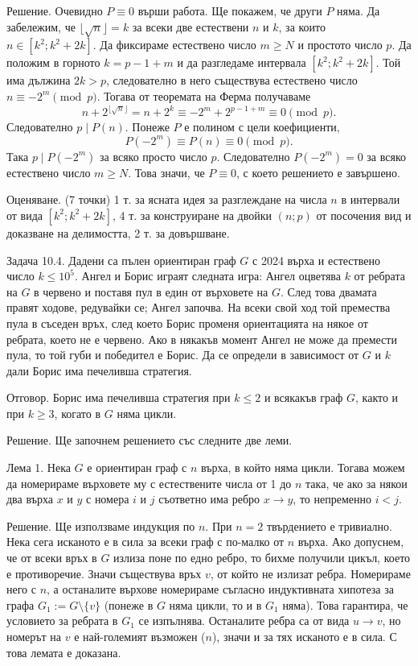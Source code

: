 Решение. Очевидно $P\equiv0$ върши работа. Ще покажем, че други $P$ няма. Да забележим, че $\lfloor\sqrt n\rfloor=k$ за всеки две естествени $n$ и $k$, за които $n\in[k^2;k^2+2k]$. Да фиксираме естествено число $m\geq N$ и простото число $p$. Да положим в горното $k=p-1+m$ и да разгледаме интервала $[k^2;k^2+2k]$. Той има дължина $2k>p$, следователно в него съществува естествено число $n\equiv-2^m\pmod p$. Тогава от теоремата на Ферма получаваме
$$
n+2^{\lfloor\sqrt n\rfloor}=n+2^k\equiv-2^m+2^{p-1+m}\equiv0\pmod p.
$$
Следователно $p\mid P(n)$. Понеже $P$ е полином с цели коефициенти,
$$
P(-2^m)\equiv P(n)\equiv0\pmod p.
$$
Така $p\mid P(-2^m)$ за всяко просто число $p$. Следователно $P(-2^m)=0$ за всяко естествено число $m\geq N$. Това значи, че $P\equiv0$, с което решението е завършено.

Оценяване. (7 точки) 1 т. за ясната идея за разглеждане на числа $n$ в интервали от вида $[k^2;k^2+2k]$, 4 т. за конструиране на двойки $(n;p)$ от посочения вид и доказване на делимостта, 2 т. за довършване.

Задача 10.4. Дадени са пълен ориентиран граф $G$ с 2024 върха и естествено число $k\leq10^5$. Ангел и Борис играят следната игра: Ангел оцветява $k$ от ребрата на $G$ в червено и поставя пул в един от върховете на $G$. След това двамата правят ходове, редувайки се; Ангел започва. На всеки свой ход той премества пула в съседен връх, след което Борис променя ориентацията на някое от ребрата, което не е червено. Ако в някакъв момент Ангел не може да премести пула, то той губи и победител е Борис. Да се определи в зависимост от $G$ и $k$ дали Борис има печеливша стратегия.

Отговор. Борис има печеливша стратегия при $k\leq2$ и всякакъв граф $G$, както и при $k\geq3$, когато в $G$ няма цикли.

Решение. Ще започнем решението със следните две леми.

Лема 1. Нека $G$ е ориентиран граф с $n$ върха, в който няма цикли. Тогава можем да номерираме върховете му с естествените числа от 1 до $n$ така, че ако за някои два върха $x$ и $y$ с номера $i$ и $j$ съответно има ребро $x\to y$, то непременно $i<j$.

Решение. Ще използваме индукция по $n$. При $n=2$ твърдението е тривиално. Нека сега исканото е в сила за всеки граф с по-малко от $n$ върха. Ако допуснем, че от всеки връх в $G$ излиза поне по едно ребро, то бихме получили цикъл, което е противоречие. Значи съществува връх $v$, от който не излизат ребра. Номерираме него с $n$, а останалите върхове номерираме съгласно индуктивната хипотеза за графа $G_1:=G\setminus\{v\}$ (понеже в $G$ няма цикли, то и в $G_1$ няма). Това гарантира, че условието за ребрата в $G_1$ се изпълнява. Останалите ребра са от вида $u\to v$, но номерът на $v$ е най-големият възможен ($n$), значи и за тях исканото е в сила. С това лемата е доказана.

